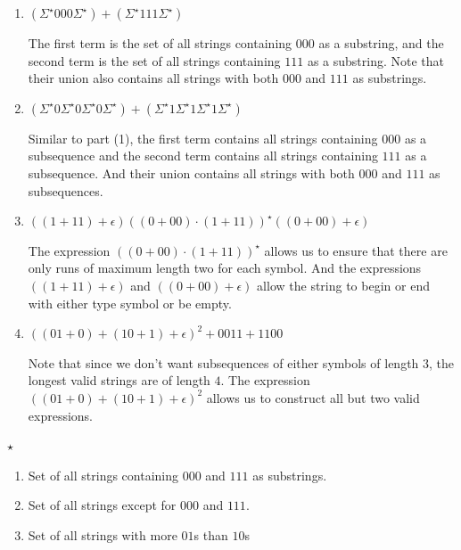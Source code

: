 \documentclass[12pt]{article}
\begin{document}
\begin{solution}
    \bbni
    \begin{enumerate}
        \item $(\Sigma^\star000\Sigma^\star) + (\Sigma^\star111\Sigma^\star)$
        
        The first term is the set of all strings containing $000$ as a substring, and the second term is the set of all strings containing $111$ as a substring. Note that their union also contains all strings with both $000$ and $111$ as substrings. 

        \item $(\Sigma^\star 0 \Sigma^\star0 \Sigma^\star0\Sigma^\star) + (\Sigma^\star 1 \Sigma^\star 1 \Sigma^\star 1 \Sigma^\star)$
        
        Similar to part (1), the first term contains all strings containing $000$ as a subsequence and the second term contains all strings containing $111$ as a subsequence. And their union contains all strings with both $000$ and $111$ as subsequences. 

        \item $((1 + 11) + \epsilon)((0+00)\cdot(1+11))^\star((0+00)+\epsilon)$
        
        The expression $((0+00)\cdot(1+11))^\star$ allows us to ensure that there are only runs of maximum length two for each symbol. And the expressions $((1 + 11) + \epsilon)$ and $((0+00)+\epsilon)$ allow the string to begin or end with either type symbol or be empty. 

        \item $((01 + 0) + (10 + 1) + \epsilon)^2 + 0011 + 1100$
        
        Note that since we don't want subsequences of either symbols of length $3$, the longest valid strings are of length $4$. The expression $((01 + 0) + (10 + 1) + \epsilon)^2$ allows us to construct all but two valid expressions. 
    \end{enumerate}
\end{solution}

\begin{problem}{$\star$}

    \begin{enumerate}
        \item[5.] Set of all strings containing $000$ and $111$ as substrings.
        \item[7.]  Set of all strings except for $000$ and $111$. 
        \item[8.] Set of all strings with more $01$s than $10$s
    \end{enumerate}
\end{problem}
\end{document}
